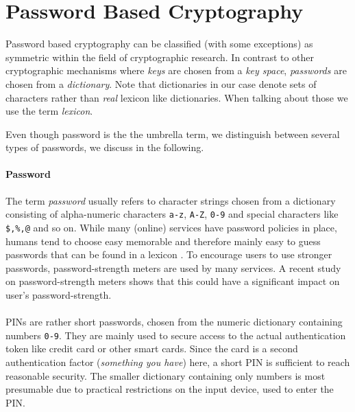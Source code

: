 \section{Password Based Cryptography}
Password based cryptography can be classified (with some exceptions) as symmetric within the field of cryptographic research.
In contrast to other cryptographic mechanisms where \emph{keys} are chosen from a \emph{key space}, \emph{passwords} are chosen from a \emph{dictionary}.
Note that dictionaries in our case denote sets of characters rather than \emph{real} lexicon like dictionaries.
When talking about those we use the term \emph{lexicon}.

Even though password is the the umbrella term, we distinguish between several types of passwords, we discuss in the following.

\paragraph{Password}
The term \emph{password} usually refers to character strings chosen from a dictionary consisting of alpha-numeric characters \texttt{a-z}, \texttt{A-Z}, \texttt{0-9} and special characters like \texttt{\$,\%,@} and so on.
While many (online) services have password policies in place, humans tend to choose easy memorable and therefore mainly easy to guess passwords that can be found in a lexicon \cite{Florencio2007,Gaw2006}.
To encourage users to use stronger passwords, password-strength meters are used by many services.
A recent study \cite{Ur2012} on password-strength meters shows that this could have a significant impact on user's password-strength.

\paragraph{}
\acp{PIN} are rather short passwords, chosen from the numeric dictionary containing numbers \texttt{0-9}.
They are mainly used to secure access to the actual authentication token like credit card or other smart cards.
Since the card is a second authentication factor (\emph{something you have}) here, a short \ac{PIN} is sufficient to reach reasonable security.
The smaller dictionary containing only numbers is most presumable due to practical restrictions on the input device, used to enter the \ac{PIN}.

